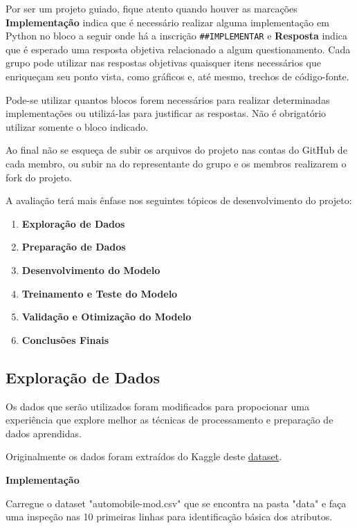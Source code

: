 \documentclass[11pt]{article}
\providecommand{\tightlist}{%
      \setlength{\itemsep}{0pt}\setlength{\parskip}{0pt}}
\begin{document}
Por ser um projeto guiado, fique atento quando houver as marcações
\textbf{Implementação} indica que é necessário realizar alguma
implementação em Python no bloco a seguir onde há a inscrição
\texttt{\#\#IMPLEMENTAR} e \textbf{Resposta} indica que é esperado uma
resposta objetiva relacionado a algum questionamento. Cada grupo pode
utilizar nas respostas objetivas quaisquer itens necessários que
enriqueçam seu ponto vista, como gráficos e, até mesmo, trechos de
código-fonte.

Pode-se utilizar quantos blocos forem necessários para realizar
determinadas implementações ou utilizá-las para justificar as respostas.
Não é obrigatório utilizar somente o bloco indicado.

Ao final não se esqueça de subir os arquivos do projeto nas contas do
GitHub de cada membro, ou subir na do representante do grupo e os
membros realizarem o fork do projeto.

A avaliação terá mais ênfase nos seguintes tópicos de desenvolvimento do
projeto:

\begin{enumerate}
\def\labelenumi{\arabic{enumi}.}
\tightlist
\item
  \textbf{Exploração de Dados}
\item
  \textbf{Preparação de Dados}
\item
  \textbf{Desenvolvimento do Modelo}
\item
  \textbf{Treinamento e Teste do Modelo}
\item
  \textbf{Validação e Otimização do Modelo}
\item
  \textbf{Conclusões Finais}
\end{enumerate}

\subsection{Exploração de Dados}\label{explorauxe7uxe3o-de-dados}

    Os dados que serão utilizados foram modificados para propocionar uma
experiência que explore melhor as técnicas de processamento e preparação
de dados aprendidas.

Originalmente os dados foram extraídos do Kaggle deste
\href{https://www.kaggle.com/nisargpatel/automobiles/data}{dataset}.

    \textbf{Implementação}

Carregue o dataset "automobile-mod.csv" que se encontra na pasta "data"
e faça uma inspeção nas 10 primeiras linhas para identificação básica
dos atributos.
\end{document}
